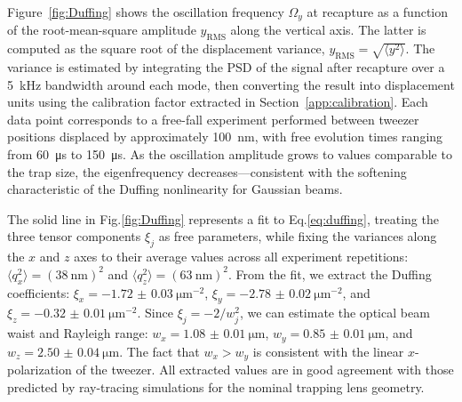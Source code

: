 \documentclass[aps,amssymb,amsmath,prb,superscriptaddress,reprint,notitlepage,onecolumn]{revtex4-1}
\newcommand{\<}{\langle}
\renewcommand{\>}{\rangle}
\begin{document}
Figure~\ref{fig:Duffing} shows the oscillation frequency $\Omega_y$ at recapture as a function of the root-mean-square amplitude $y_\mathrm{RMS}$ along the vertical axis.
%
The latter is computed as the square root of the displacement variance, $y_\mathrm{RMS} = \sqrt{\langle y^2 \rangle}$.
%
The variance is estimated by integrating the PSD of the signal after recapture over a \SI{5}{\kilo\hertz} bandwidth around each mode, then converting the result into displacement units using the calibration factor extracted in Section~\ref{app:calibration}.
%
Each data point corresponds to a free-fall experiment performed between tweezer positions displaced by approximately \SI{100}{\nano\meter}, with free evolution times ranging from \SI{60}{\micro\second} to \SI{150}{\micro\second}.
%
As the oscillation amplitude grows to values comparable to the trap size, the eigenfrequency decreases—consistent with the softening characteristic of the Duffing nonlinearity for Gaussian beams.

The solid line in Fig.\ref{fig:Duffing} represents a fit to Eq.\eqref{eq:duffing}, treating the three tensor components $\xi_j$ as free parameters, while fixing the variances along the $x$ and $z$ axes to their average values across all experiment repetitions: $\langle q_x^2 \rangle = (\SI{38}{\nano\meter})^2$ and $\langle q_z^2 \rangle = (\SI{63}{\nano\meter})^2$.
%
From the fit, we extract the Duffing coefficients:
%
$\xi_{x} = \SI{-1.72(3)}{\micro\meter^{-2}}$,
$\xi_{y} = \SI{-2.78(2)}{\micro\meter^{-2}}$, and
$\xi_{z} = \SI{-0.32(1)}{\micro\meter^{-2}}$.
%
Since $\xi_j = -2/w_j^2$, we can estimate the optical beam waist and Rayleigh range:
$w_x = \SI{1.08(1)}{\micro\meter}$,
$w_y = \SI{0.85(1)}{\micro\meter}$, and
$w_z = \SI{2.50(4)}{\micro\meter}$.
%
The fact that $w_x > w_y$ is consistent with the linear $x$-polarization of the tweezer. All extracted values are in good agreement with those predicted by ray-tracing simulations for the nominal trapping lens geometry.



 
\end{document}
